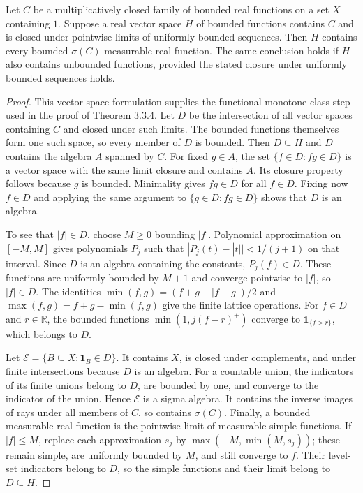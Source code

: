 \begin{lemma}\label{lem:functional-monotone-class}
\leanok
{}
Let $C$ be a multiplicatively closed family of bounded real functions
on a set $X$ containing $1$. Suppose a real vector space $H$ of bounded
functions contains $C$ and is closed under pointwise limits of uniformly
bounded sequences. Then $H$ contains every bounded $\sigma(C)$-measurable
real function.
The same conclusion holds if $H$ also contains unbounded functions,
provided the stated closure under uniformly bounded sequences holds.
\end{lemma}
\begin{proof}
This vector-space formulation supplies the functional monotone-class
step used in the proof of Theorem 3.3.4.
Let $D$ be the intersection of all vector spaces containing $C$ and
closed under such limits. The bounded functions themselves form one
such space, so every member of $D$ is bounded. Then $D\subseteq H$ and
$D$ contains the algebra $A$ spanned by $C$. For fixed $g\in A$, the
set $\{f\in D:fg\in D\}$ is a vector space with the same limit closure
and contains $A$. Its closure property follows because $g$ is bounded.
Minimality gives $fg\in D$ for all $f\in D$. Fixing now $f\in D$ and
applying the same argument to $\{g\in D:fg\in D\}$ shows that $D$ is
an algebra.

To see that $|f|\in D$, choose $M\geq0$ bounding $|f|$. Polynomial
approximation on $[-M,M]$ gives polynomials $P_j$ such that
$|P_j(t)-|t||<1/(j+1)$ on that interval. Since $D$ is an algebra
containing the constants, $P_j(f)\in D$. These functions are uniformly
bounded by $M+1$ and converge pointwise to $|f|$, so $|f|\in D$.
The identities $\min(f,g)=(f+g-|f-g|)/2$ and
$\max(f,g)=f+g-\min(f,g)$ give the finite lattice operations.
For $f\in D$ and $r\in\mathbb R$, the bounded functions
$\min(1,j(f-r)^+)$ converge to $\mathbf1_{\{f>r\}}$, which belongs to $D$.

Let $\mathcal E=\{B\subseteq X:\mathbf1_B\in D\}$. It contains $X$,
is closed under complements, and under finite intersections because
$D$ is an algebra. For a countable union, the indicators of its finite
unions belong to $D$, are bounded by one, and converge to the indicator
of the union. Hence $\mathcal E$ is a sigma algebra. It contains the
inverse images of rays under all members of $C$, so contains $\sigma(C)$.
Finally, a bounded measurable real function is the pointwise limit of
measurable simple functions. If $|f|\leq M$, replace each approximation
$s_j$ by $\max(-M,\min(M,s_j))$; these remain simple, are uniformly
bounded by $M$, and still converge to $f$. Their level-set indicators
belong to $D$, so the simple functions and their limit belong to
$D\subseteq H$.
\end{proof}

